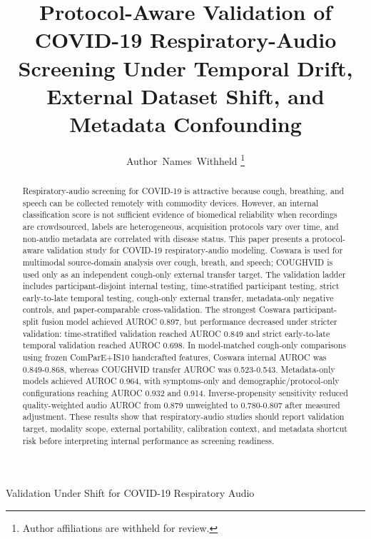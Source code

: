 \documentclass[journal]{IEEEtran}
\begin{document}
\title{Protocol-Aware Validation of COVID-19 Respiratory-Audio Screening Under Temporal Drift, External Dataset Shift, and Metadata Confounding}

\author{Author~Names~Withheld%
\thanks{Author affiliations are withheld for review.}%
}

%
{Validation Under Shift for COVID-19 Respiratory Audio}

\maketitle

\begin{abstract}
Respiratory-audio screening for COVID-19 is attractive because cough, breathing, and speech can be collected remotely with commodity devices. However, an internal classification score is not sufficient evidence of biomedical reliability when recordings are crowdsourced, labels are heterogeneous, acquisition protocols vary over time, and non-audio metadata are correlated with disease status. This paper presents a protocol-aware validation study for COVID-19 respiratory-audio modeling. Coswara is used for multimodal source-domain analysis over cough, breath, and speech; COUGHVID is used only as an independent cough-only external transfer target. The validation ladder includes participant-disjoint internal testing, time-stratified participant testing, strict early-to-late temporal testing, cough-only external transfer, metadata-only negative controls, and paper-comparable cross-validation. The strongest Coswara participant-split fusion model achieved AUROC 0.897, but performance decreased under stricter validation: time-stratified validation reached AUROC 0.849 and strict early-to-late temporal validation reached AUROC 0.698. In model-matched cough-only comparisons using frozen ComParE+IS10 handcrafted features, Coswara internal AUROC was 0.849-0.868, whereas COUGHVID transfer AUROC was 0.523-0.543. Metadata-only models achieved AUROC 0.964, with symptoms-only and demographic/protocol-only configurations reaching AUROC 0.932 and 0.914. Inverse-propensity sensitivity reduced quality-weighted audio AUROC from 0.879 unweighted to 0.780-0.807 after measured adjustment. These results show that respiratory-audio studies should report validation target, modality scope, external portability, calibration context, and metadata shortcut risk before interpreting internal performance as screening readiness.
\end{abstract}
\end{document}
